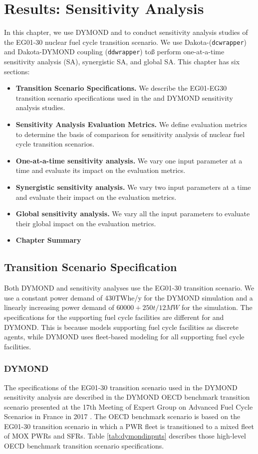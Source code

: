 \chapter{Results: Sensitivity Analysis}
In this chapter, we use DYMOND and \Cyclus to conduct 
sensitivity analysis studies of the 
EG01-30 nuclear fuel cycle transition scenario. 
We use Dakota-\Cyclus (\texttt{dcwrapper}) 
and Dakota-DYMOND coupling (\texttt{ddwrapper}) toß
perform  
one-at-a-time sensitivity analysis (SA), synergistic 
SA, and global SA. 
This chapter has six sections: 
\begin{itemize}
    \item \textbf{Transition Scenario Specifications.} We describe 
    the EG01-EG30 transition scenario specifications used 
    in the \Cyclus and DYMOND sensitivity analysis studies. 
    \item \textbf{Sensitivity Analysis Evaluation Metrics.} 
    We define evaluation metrics to determine the basis of comparison 
    for sensitivity analysis of nuclear fuel cycle transition scenarios. 
    \item \textbf{One-at-a-time sensitivity analysis.}
    We vary one input parameter at a time and evaluate its impact on 
    the evaluation metrics. 
    \item \textbf{Synergistic sensitivity analysis.}
    We vary two input parameters at a time and evaluate their impact 
    on the evaluation metrics. 
    \item \textbf{Global sensitivity analysis.}
    We vary all the input parameters to evaluate their global impact 
    on the evaluation metrics. 
    \item \textbf{Chapter Summary} 
\end{itemize}

\section{Transition Scenario Specification}
Both DYMOND and \Cyclus sensitivity analyses 
use the EG01-30 transition scenario.
We use a constant power demand of 430TWhe/y for the DYMOND simulation
and a linearly increasing power demand of $60000+250t/12 MW$
for the \Cyclus simulation.
The specifications for the supporting fuel cycle facilities are different 
for \Cyclus and DYMOND. 
This is because \Cyclus models supporting fuel cycle facilities as discrete agents, 
while DYMOND uses fleet-based modeling for all supporting fuel cycle
facilities. 

\subsection{DYMOND}
The specifications of the EG01-30 transition scenario used in the 
DYMOND sensitivity analysis
are described in the DYMOND OECD benchmark transition 
scenario presented at the 17th Meeting of Expert Group on Advanced 
Fuel Cycle Scenarios in France in 2017 
\cite{oecd_nuclear_energy_agency_wpfc_nodate}. 
The OECD benchmark scenario is based on the EG01-30 transition scenario 
in which a \gls{PWR} fleet is transitioned to
a mixed fleet of \gls{MOX} \glspl{PWR} and \glspl{SFR}. 
Table \ref{tab:dymondinputs} describes those high-level OECD benchmark transition 
scenario specifications. 

